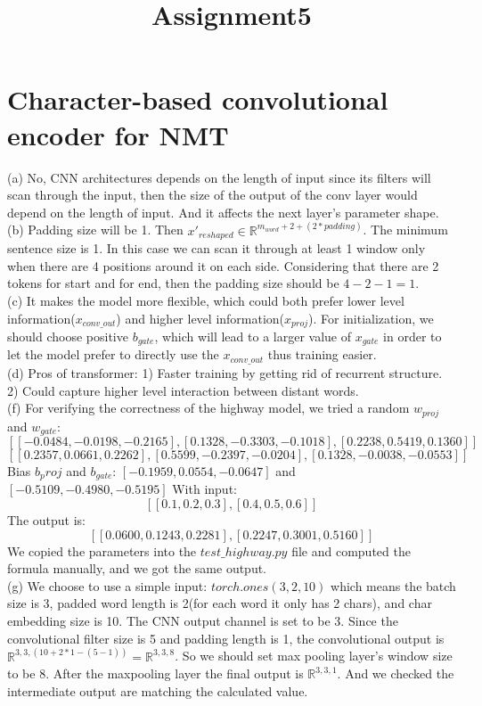 \documentclass[11pt]{article}
\title{Assignment5}
\begin{document}
\maketitle
\section{Character-based convolutional encoder for NMT}
(a) No, CNN architectures depends on the length of input since its filters will scan through the input, then the size of the output of the conv layer would depend on the length of input. And it affects the next layer's parameter shape.\\
(b) Padding size will be 1. Then $x'_{reshaped}\in \mathbb R^{m_{word}+2 + (2*padding)}$. The minimum sentence size is 1. In this case we can scan it through at least 1 window only when there are 4 positions around it on each side. Considering that there are 2 tokens for start and for end, then the padding size should be $4-2-1 = 1$.\\
(c) It makes the model more flexible, which could both prefer lower level information($x_{conv\_out}$) and higher level information($x_{proj}$). For initialization, we should choose positive $b_{gate}$, which will lead to a larger value of $x_{gate}$ in order to let the model prefer to directly use the $x_{conv\_out}$ thus training easier.\\
(d) Pros of transformer: 1) Faster training by getting rid of recurrent structure. 2) Could capture higher level interaction between distant words.\\
(f) For verifying the correctness of the highway model, we tried a random $w_{proj}$ and $w_{gate}$:
$$[[-0.0484, -0.0198, -0.2165],
[ 0.1328, -0.3303, -0.1018],
[ 0.2238,  0.5419,  0.1360]]$$
$$[[ 0.2357,  0.0661,  0.2262],
[ 0.5599, -0.2397, -0.0204],
[ 0.1328, -0.0038, -0.0553]]$$
Bias $b_proj$ and $b_{gate}$:
$[-0.1959,  0.0554, -0.0647]$ and $[-0.5109, -0.4980, -0.5195]$
With input: $$[[0.1, 0.2, 0.3], [0.4, 0.5, 0.6]]$$
The output is: $$[[0.0600, 0.1243, 0.2281], [0.2247, 0.3001, 0.5160]]$$
We copied the parameters into the $test\_highway.py$ file and computed the formula manually, and we got the same output.\\
(g) We choose to use a simple input: $torch.ones(3, 2, 10)$ which means the batch size is 3, padded word length is 2(for each word it only has 2 chars), and char embedding size is 10. The CNN output channel is set to be 3. Since the convolutional filter size is 5 and padding length is 1, the convolutional output is $\mathbb{R}^{3,3, (10+2*1-(5-1))} = \mathbb{R}^{3,3,8}$. So we should set max pooling layer's window size to be 8. After the maxpooling layer the final output is $\mathbb{R}^{3,3,1}$. And we checked the intermediate output are matching the calculated value.
\end{document}
